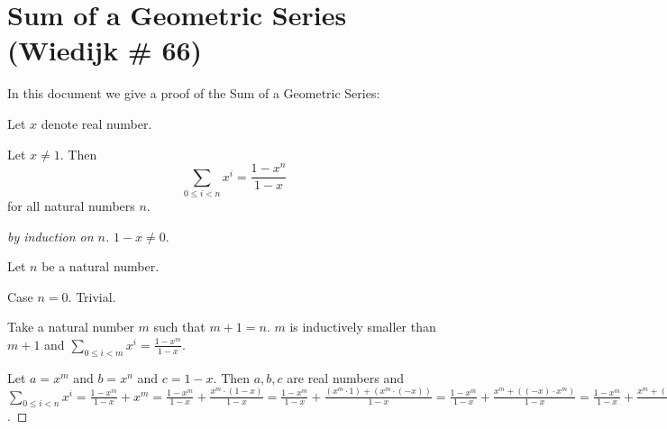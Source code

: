 \documentclass{article}
\begin{document}
    

\section{Sum of a Geometric Series (Wiedijk \# 66)}

\newcommand{\sumgeom}[2]{\sum_{0 \leq i < #2} {#1}^i}

In this document we give a proof of the Sum of a Geometric Series:

\begin{forthel}


Let $x$ denote real number. 


\begin{theorem} Let $x \neq 1$. Then
$$\sumgeom{x}{n} = \frac{1 - x^{n}}{1 - x}$$
for all natural numbers $n$.
\end{theorem}
\begin{proof}[by induction on $n$]

$1 - x \neq 0$.

Let $n$ be a natural number.

Case $n = 0$. Trivial.

Take a natural number $m$ such that $m + 1 = n$. 
$m$ is inductively smaller than $m+1$ and
$\sumgeom{x}{m} = \frac{1 - x^{m}}{1 - x}$.


Let $a = x^{m}$ and $b = x^{n}$ and $c=1-x$.
Then $a,b,c$ are real numbers and
$\sumgeom{x}{n} =
\frac{1 - x^{m}}{1 - x} + x^{m} = 
\frac{1 - x^{m}}{1 - x} + \frac{x^{m} \cdot (1-x)}{1 - x} =
\frac{1 - x^{m}}{1 - x} + \frac{(x^{m} \cdot 1) + (x^{m} \cdot (-x))}{1 - x} = 
\frac{1 - x^{m}}{1 - x} + \frac{x^{m} + ((-x) \cdot x^{m})}{1 - x} =
\frac{1 - x^{m}}{1 - x} + \frac{x^{m} + (-(x \cdot x^{m}))}{1 - x} =
\frac{1 - x^{m}}{1 - x} + \frac{x^{m} - x^{n}}{1 - x} = 
\frac{1 - a}{c} + \frac{a - b}{c} =
\frac{1 - b}{c} = 
\frac{1 - x^{n}}{1 - x}$.

\end{proof}

\end{forthel}
\end{document}
